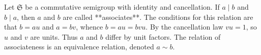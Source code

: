 Let $\mathfrak{S}$ be a commutative semigroup with identity and cancellation. If $a \mid b$ and $b \mid a$, then $a$ and $b$ are called **associates**. The conditions for this relation are that $b = au$ and $a = bv$, whence $b = au = bvu$. By the cancellation law $vu = 1$, so $u$ and $v$ are units. Thus $a$ and $b$ differ by unit factors. The relation of associateness is an equivalence relation, denoted $a \sim b$.
